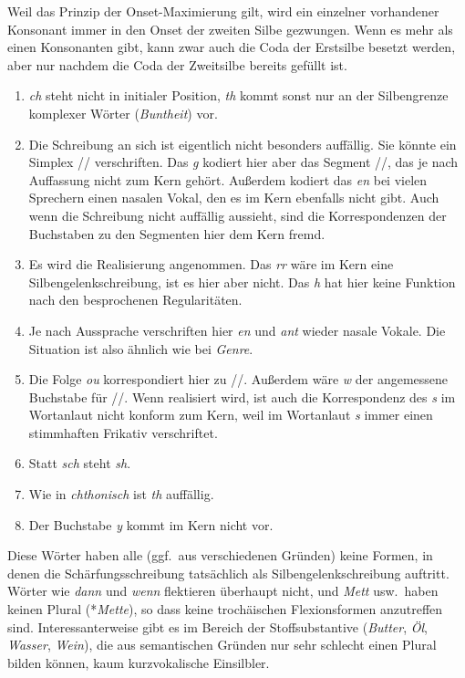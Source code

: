  Weil das Prinzip der Onset-Maximierung gilt, wird ein einzelner vorhandener Konsonant immer in den Onset der zweiten Silbe gezwungen.
Wenn es mehr als einen Konsonanten gibt, kann zwar auch die Coda der Erstsilbe besetzt werden, aber nur nachdem die Coda der Zweitsilbe bereits gefüllt ist.


\begin{enumerate}\Lf
  \item \textit{ch} steht nicht in initialer Position, \textit{th} kommt sonst nur an der Silbengrenze komplexer Wörter (\textit{Buntheit}) vor.
  \item Die Schreibung an sich ist eigentlich nicht besonders auffällig.
    Sie könnte ein Simplex // verschriften.
    Das \textit{g} kodiert hier aber das Segment //, das je nach Auffassung nicht zum Kern gehört.
    Außerdem kodiert das \textit{en} bei vielen Sprechern einen nasalen Vokal, den es im Kern ebenfalls nicht gibt.
    Auch wenn die Schreibung nicht auffällig aussieht, sind die Korrespondenzen der Buchstaben zu den Segmenten hier dem Kern fremd.
  \item Es wird die Realisierung \textipa{[gonoK\o:]} angenommen.
    Das \textit{rr} wäre im Kern eine Silbengelenkschreibung, ist es hier aber nicht.
    Das \textit{h} hat hier keine Funktion nach den besprochenen Regularitäten.
  \item Je nach Aussprache verschriften hier \textit{en} und \textit{ant} wieder nasale Vokale.
    Die Situation ist also ähnlich wie bei \textit{Genre}.
  \item Die Folge \textit{ou} korrespondiert hier zu //.
    Außerdem wäre \textit{w} der angemessene Buchstabe für //.
    Wenn \textipa{[su:v@n\t{i5}]} realisiert wird, ist auch die Korrespondenz des \textit{s} im Wortanlaut nicht konform zum Kern, weil im Wortanlaut \textit{s} immer einen stimmhaften Frikativ verschriftet.
  \item Statt \textit{sch} steht \textit{sh}.
  \item Wie in \textit{chthonisch} ist \textit{th} auffällig.
  \item Der Buchstabe \textit{y} kommt im Kern nicht vor.
\end{enumerate}


 Diese Wörter haben alle (ggf.\ aus verschiedenen Gründen) keine Formen, in denen die Schärfungsschreibung tatsächlich als Silbengelenkschreibung auftritt.
Wörter wie \textit{dann} und \textit{wenn} flektieren überhaupt nicht, und \textit{Mett} usw.\ haben keinen Plural (*\textit{Mette}), so dass keine trochäischen Flexionsformen anzutreffen sind.
Interessanterweise gibt es im Bereich der Stoffsubstantive (\textit{Butter}, \textit{Öl}, \textit{Wasser}, \textit{Wein}), die aus semantischen Gründen nur sehr schlecht einen Plural bilden können, kaum kurzvokalische Einsilbler.

